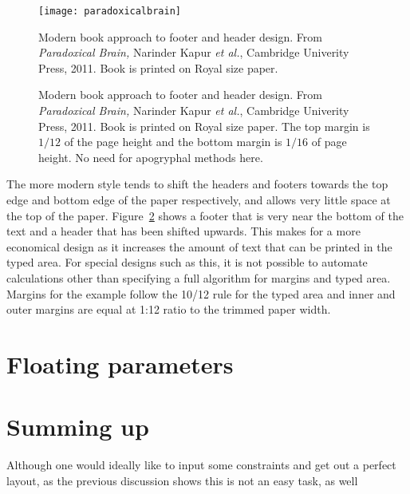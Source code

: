\begin{figure}[htbp]
\texttt{[image: paradoxicalbrain]}

\caption{Modern book approach to footer and header design. From \textit{Paradoxical Brain,} Narinder Kapur \textit{et al.}, Cambridge Univerity Press, 2011. Book is printed on Royal size paper.}
\label{fig:paradoxical}
\end{figure}

\begin{figure}[htbp]
{{\parindent0pt
}}
\caption{Modern book approach to footer and header design. From \textit{Paradoxical Brain,} Narinder Kapur \textit{et al.}, Cambridge Univerity Press, 2011. Book is printed on Royal size paper. The top margin is $1/12$ of the page height and the bottom margin is $1/16$ of page height. No need for apogryphal methods here.}
\label{fig:paradoxical}
\end{figure}

The more modern style tends to shift the headers and footers towards the top edge and bottom edge of the paper respectively, and allows very little space at the top of the paper. Figure~\ref{fig:paradoxical} shows a footer that is very near the bottom of the text and a header that has been shifted upwards. This makes for a more economical design as it increases the amount of text that can be printed in the typed area. For special designs such as this, it is not possible to automate calculations other than specifying a full algorithm for margins and typed area. Margins for the example follow the 10/12 rule for the typed area and inner and outer margins are equal at 1:12 ratio to the trimmed paper width.


\section{Floating parameters}


\section{Summing up}

Although one would ideally like to input some constraints and get out a perfect layout, as the previous discussion shows this is not an easy task, as well 

